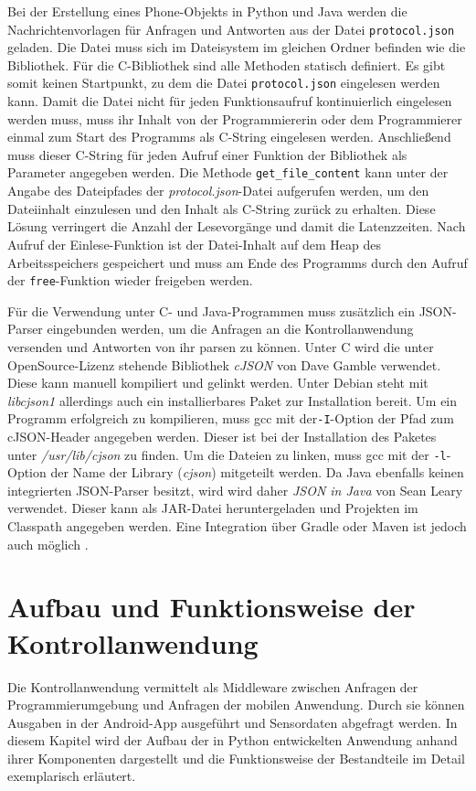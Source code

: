 \documentclass[11pt,a4paper]{report}
\begin{document}
Bei der Erstellung eines Phone-Objekts in Python und Java werden die Nachrichtenvorlagen für Anfragen und Antworten aus der Datei \texttt{protocol.json} geladen.
Die Datei muss sich im Dateisystem im gleichen Ordner befinden wie die Bibliothek.
Für die C-Bibliothek sind alle Methoden statisch definiert.
Es gibt somit keinen Startpunkt, zu dem die Datei \texttt{protocol.json} eingelesen werden kann.
Damit die Datei nicht für jeden Funktionsaufruf kontinuierlich eingelesen werden muss, muss ihr Inhalt von der Programmiererin oder dem Programmierer einmal zum Start des Programms als C-String eingelesen werden.
Anschließend muss dieser C-String für jeden Aufruf einer Funktion der Bibliothek als Parameter angegeben werden.
Die Methode \texttt{get\_file\_content} kann unter der Angabe des Dateipfades der \textit{protocol.json}-Datei aufgerufen werden, um den Dateiinhalt einzulesen und den Inhalt als C-String zurück zu erhalten.
Diese Lösung verringert die Anzahl der Lesevorgänge und damit die Latenzzeiten.
Nach Aufruf der Einlese-Funktion ist der Datei-Inhalt auf dem Heap des Arbeitsspeichers gespeichert und muss am Ende des Programms durch den Aufruf der \texttt{free}-Funktion wieder freigeben werden. 

Für die Verwendung unter C- und Java-Programmen muss zusätzlich ein JSON-Parser eingebunden werden, um die Anfragen an die Kontrollanwendung versenden und Antworten von ihr parsen zu können.
Unter C wird die unter OpenSource-Lizenz stehende Bibliothek \textit{cJSON} von Dave Gamble \cite{cjson} verwendet.
Diese kann manuell kompiliert und gelinkt werden.
Unter Debian steht mit \textit{libcjson1} \cite{cjson-package} allerdings auch ein installierbares Paket zur Installation bereit.
Um ein Programm erfolgreich zu kompilieren, muss gcc mit der\texttt{-I}-Option der Pfad zum cJSON-Header angegeben werden.
Dieser ist bei der Installation des Paketes unter \textit{/usr/lib/cjson} zu finden.
Um die Dateien zu linken, muss gcc mit der \texttt{-l}-Option der Name der Library (\textit{cjson}) mitgeteilt werden.
Da Java ebenfalls keinen integrierten JSON-Parser besitzt, wird wird daher \textit{JSON in Java} \cite{json_java} von Sean Leary verwendet.
Dieser kann als JAR-Datei heruntergeladen und Projekten im Classpath angegeben werden.
Eine Integration über Gradle oder Maven ist jedoch auch möglich \cite{json_java_maven}.

\chapter{Aufbau und Funktionsweise der Kontrollanwendung}\label{chap:server_software}
Die Kontrollanwendung vermittelt als Middleware zwischen Anfragen der Programmierumgebung und Anfragen der mobilen Anwendung.
Durch sie können Ausgaben in der Android-App ausgeführt und Sensordaten abgefragt werden.
In diesem Kapitel wird der Aufbau der in Python entwickelten Anwendung anhand ihrer Komponenten dargestellt und die Funktionsweise der Bestandteile im Detail exemplarisch erläutert.
\end{document}
